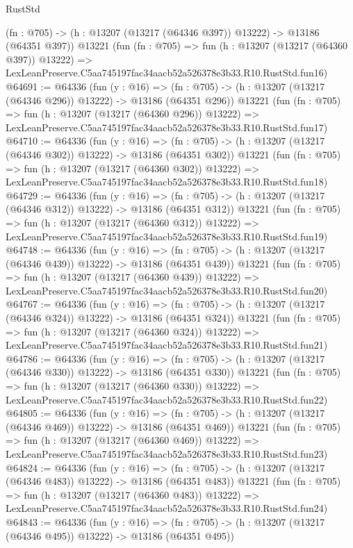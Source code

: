 \begin{lexlean}{RustStd}
\begin{coremodule}
    (fn : @705) -> (h : @13207 (@13217 (@64346 @397)) @13222) -> @13186 (@64351 @397))
    @13221
    (fun (fn : @705) =>
    fun (h : @13207 (@13217 (@64360 @397)) @13222) =>
    LexLeanPreserve.C5aa745197fac34aacb52a526378e3b33.R10.RustStd.fun16)
@64691 := @64336
    (fun (y : @16) =>
    (fn : @705) -> (h : @13207 (@13217 (@64346 @296)) @13222) -> @13186 (@64351 @296))
    @13221
    (fun (fn : @705) =>
    fun (h : @13207 (@13217 (@64360 @296)) @13222) =>
    LexLeanPreserve.C5aa745197fac34aacb52a526378e3b33.R10.RustStd.fun17)
@64710 := @64336
    (fun (y : @16) =>
    (fn : @705) -> (h : @13207 (@13217 (@64346 @302)) @13222) -> @13186 (@64351 @302))
    @13221
    (fun (fn : @705) =>
    fun (h : @13207 (@13217 (@64360 @302)) @13222) =>
    LexLeanPreserve.C5aa745197fac34aacb52a526378e3b33.R10.RustStd.fun18)
@64729 := @64336
    (fun (y : @16) =>
    (fn : @705) -> (h : @13207 (@13217 (@64346 @312)) @13222) -> @13186 (@64351 @312))
    @13221
    (fun (fn : @705) =>
    fun (h : @13207 (@13217 (@64360 @312)) @13222) =>
    LexLeanPreserve.C5aa745197fac34aacb52a526378e3b33.R10.RustStd.fun19)
@64748 := @64336
    (fun (y : @16) =>
    (fn : @705) -> (h : @13207 (@13217 (@64346 @439)) @13222) -> @13186 (@64351 @439))
    @13221
    (fun (fn : @705) =>
    fun (h : @13207 (@13217 (@64360 @439)) @13222) =>
    LexLeanPreserve.C5aa745197fac34aacb52a526378e3b33.R10.RustStd.fun20)
@64767 := @64336
    (fun (y : @16) =>
    (fn : @705) -> (h : @13207 (@13217 (@64346 @324)) @13222) -> @13186 (@64351 @324))
    @13221
    (fun (fn : @705) =>
    fun (h : @13207 (@13217 (@64360 @324)) @13222) =>
    LexLeanPreserve.C5aa745197fac34aacb52a526378e3b33.R10.RustStd.fun21)
@64786 := @64336
    (fun (y : @16) =>
    (fn : @705) -> (h : @13207 (@13217 (@64346 @330)) @13222) -> @13186 (@64351 @330))
    @13221
    (fun (fn : @705) =>
    fun (h : @13207 (@13217 (@64360 @330)) @13222) =>
    LexLeanPreserve.C5aa745197fac34aacb52a526378e3b33.R10.RustStd.fun22)
@64805 := @64336
    (fun (y : @16) =>
    (fn : @705) -> (h : @13207 (@13217 (@64346 @469)) @13222) -> @13186 (@64351 @469))
    @13221
    (fun (fn : @705) =>
    fun (h : @13207 (@13217 (@64360 @469)) @13222) =>
    LexLeanPreserve.C5aa745197fac34aacb52a526378e3b33.R10.RustStd.fun23)
@64824 := @64336
    (fun (y : @16) =>
    (fn : @705) -> (h : @13207 (@13217 (@64346 @483)) @13222) -> @13186 (@64351 @483))
    @13221
    (fun (fn : @705) =>
    fun (h : @13207 (@13217 (@64360 @483)) @13222) =>
    LexLeanPreserve.C5aa745197fac34aacb52a526378e3b33.R10.RustStd.fun24)
@64843 := @64336
    (fun (y : @16) =>
    (fn : @705) -> (h : @13207 (@13217 (@64346 @495)) @13222) -> @13186 (@64351 @495))

\end{coremodule}
\end{lexlean}
